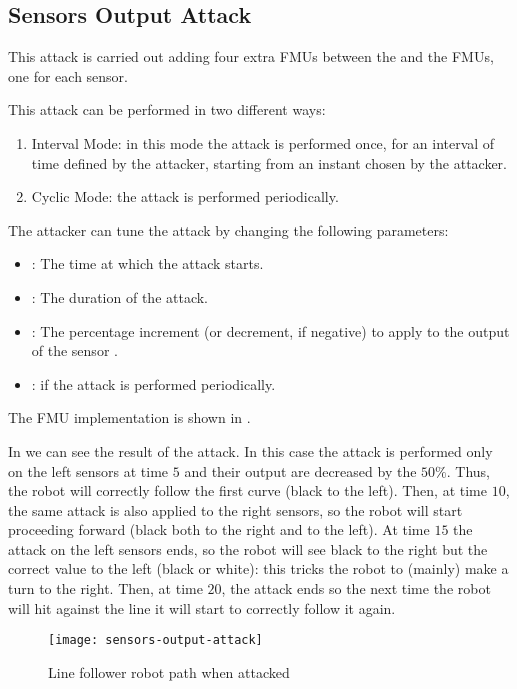 \subsection{Sensors Output Attack}

This attack is carried out adding four extra FMUs between the 
and the  FMUs, one for each sensor.

This attack can be performed in two different ways:
\begin{enumerate}
	\item Interval Mode: in this mode the attack is performed once, for an
		interval of time defined by the attacker, starting from an
		instant chosen by the attacker.
	\item Cyclic Mode: the attack is performed periodically.
\end{enumerate}

The attacker can tune the attack by changing the following parameters:
\begin{itemize}
	\item {}: The time at which the attack starts.
	\item {}: The duration of the attack.
	\item {}: The percentage increment (or decrement,
		if negative) to apply to the output of the sensor .
	\item {}: if  the attack is performed
		periodically.
\end{itemize}

The FMU implementation is shown in .



In  we can see the result of the attack. In
this case the attack is performed only on the left sensors at time \(5\) and
their output are decreased by the \(50\%\). Thus, the robot will correctly
follow the first curve (black to the left). Then, at time \(10\), the same
attack is also applied to the right sensors, so the robot will start proceeding
forward (black both to the right and to the left). At time \(15\) the attack on
the left sensors ends, so the robot will see black to the right but the correct
value to the left (black or white): this tricks the robot to (mainly) make a
turn to the right. Then, at time \(20\), the attack ends so the next time the
robot will hit against the line it will start to correctly follow it again.

\begin{figure}[htb]
	\centering
	\texttt{[image: sensors-output-attack]}
	\caption{Line follower robot path when
	attacked}\label{fig:sensorsoutputatkresult}
\end{figure}
